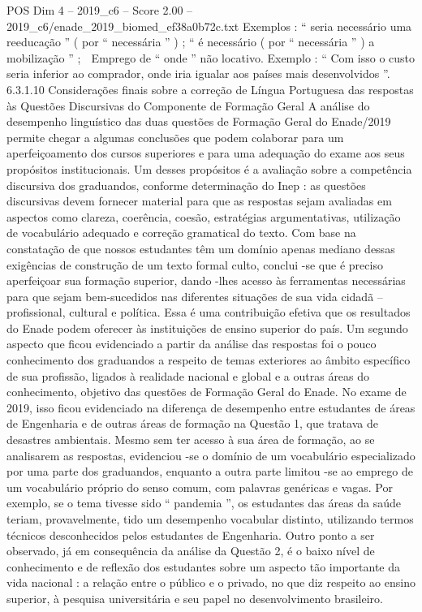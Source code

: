 \begin{textsample}{POS Dim 4 – 2019\_c6 – Score 2.00 – 2019\_c6/enade\_2019\_biomed\_ef38a0b72c.txt}
Exemplos : “ seria necessário uma reeducação ” ( por “ necessária ” ) ; “ é necessário ( por “ necessária ” ) a mobilização ” ;  Emprego de “ onde ” não locativo.
Exemplo : “ Com isso o custo seria inferior ao comprador, onde iria igualar aos países mais desenvolvidos ”. 6.3.1.10 Considerações finais sobre a correção de Língua Portuguesa das respostas às Questões Discursivas do Componente de Formação Geral A análise do desempenho linguístico das duas questões de Formação Geral do Enade/2019 permite chegar a algumas conclusões que podem colaborar para um aperfeiçoamento dos cursos superiores e para uma adequação do exame aos seus propósitos institucionais.
Um desses propósitos é a avaliação sobre a competência discursiva dos graduandos, conforme determinação do Inep : as questões discursivas devem fornecer material para que as respostas sejam avaliadas em aspectos como clareza, coerência, coesão, estratégias argumentativas, utilização de vocabulário adequado e correção gramatical do texto.
Com base na constatação de que nossos estudantes têm um domínio apenas mediano dessas exigências de construção de um texto formal culto, conclui -se que é preciso aperfeiçoar sua formação superior, dando -lhes acesso às ferramentas necessárias para que sejam bem-sucedidos nas diferentes situações de sua vida cidadã – profissional, cultural e política.
Essa é uma contribuição efetiva que os resultados do Enade podem oferecer às instituições de ensino superior do país.
Um segundo aspecto que ficou evidenciado a partir da análise das respostas foi o pouco conhecimento dos graduandos a respeito de temas exteriores ao âmbito específico de sua profissão, ligados à realidade nacional e global e a outras áreas do conhecimento, objetivo das questões de Formação Geral do Enade.
No exame de 2019, isso ficou evidenciado na diferença de desempenho entre estudantes de áreas de Engenharia e de outras áreas de formação na Questão 1, que tratava de desastres ambientais.
Mesmo sem ter acesso à sua área de formação, ao se analisarem as respostas, evidenciou -se o domínio de um vocabulário especializado por uma parte dos graduandos, enquanto a outra parte limitou -se ao emprego de um vocabulário próprio do senso comum, com palavras genéricas e vagas.
Por exemplo, se o tema tivesse sido “ pandemia ”, os estudantes das áreas da saúde teriam, provavelmente, tido um desempenho vocabular distinto, utilizando termos técnicos desconhecidos pelos estudantes de Engenharia.
Outro ponto a ser observado, já em consequência da análise da Questão 2, é o baixo nível de conhecimento e de reflexão dos estudantes sobre um aspecto tão importante da vida nacional : a relação entre o público e o privado, no que diz respeito ao ensino superior, à pesquisa universitária e seu papel no desenvolvimento brasileiro.

\end{textsample}
